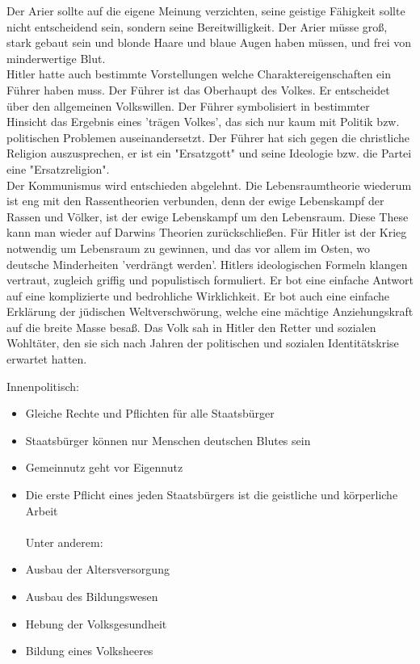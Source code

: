\documentclass[letterpaper, 12pt]{article}
\begin{document}
Der Arier sollte auf die eigene Meinung verzichten, seine geistige Fähigkeit sollte nicht entscheidend sein, sondern seine Bereitwilligkeit. Der Arier müsse groß, stark gebaut sein und blonde Haare und blaue Augen haben müssen, und frei von minderwertige Blut. \\
Hitler hatte auch bestimmte Vorstellungen welche Charaktereigenschaften ein Führer haben muss. Der Führer ist das Oberhaupt des Volkes. Er entscheidet über den allgemeinen Volkswillen. Der Führer symbolisiert in bestimmter Hinsicht das Ergebnis eines 'trägen Volkes', das sich nur kaum mit Politik bzw. politischen Problemen auseinandersetzt. Der Führer hat sich gegen die christliche Religion auszusprechen, er ist ein "Ersatzgott" und seine Ideologie bzw. die Partei eine "Ersatzreligion". \\
Der Kommunismus wird entschieden abgelehnt. Die Lebensraumtheorie wiederum ist eng mit den Rassentheorien verbunden, denn der ewige Lebenskampf der Rassen und Völker, ist der ewige Lebenskampf um den Lebensraum. Diese These kann man wieder auf Darwins Theorien zurückschließen. Für Hitler ist der Krieg notwendig um Lebensraum zu gewinnen, und das vor allem im Osten, wo deutsche Minderheiten 'verdrängt werden'. \clearpage
Hitlers ideologischen Formeln klangen vertraut, zugleich griffig und populistisch formuliert. Er bot eine einfache Antwort auf eine komplizierte und bedrohliche Wirklichkeit. Er bot auch eine einfache Erklärung der jüdischen Weltverschwörung, welche eine mächtige Anziehungskraft auf die breite Masse besaß. Das Volk sah in Hitler den Retter und sozialen Wohltäter, den sie sich nach Jahren der politischen und sozialen Identitätskrise erwartet hatten.


Innenpolitisch:

\begin{itemize}
	\item Gleiche Rechte und Pflichten für alle Staatsbürger
    \item Staatsbürger können nur Menschen deutschen Blutes sein
    \item Gemeinnutz geht vor Eigennutz
    \item Die erste Pflicht eines jeden Staatsbürgers ist die geistliche und körperliche Arbeit \\ \\ Unter anderem:
    \item Ausbau der Altersversorgung
    \item Ausbau des Bildungswesen
    \item Hebung der Volksgesundheit
    \item Bildung eines Volksheeres
\end{itemize}
\end{document}
